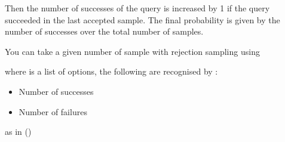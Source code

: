 \documentclass[letterpaper,10pt,english]{sphinxmanual}
\begin{document}
\sphinxAtStartPar
Then the number of successes of the query is increased by 1 if the query succeeded in the last accepted sample.
The final probability is given by the number of successes over the total number of samples.

\sphinxAtStartPar
You can take a given number of sample with rejection sampling using

\begin{sphinxVerbatim}[commandchars=\\\{\}]
  
\end{sphinxVerbatim}

\sphinxAtStartPar
where  is a list of options, the following are recognised by :
\begin{itemize}
\item {} 
\sphinxAtStartPar
{} Number of successes

\item {} 
\sphinxAtStartPar
{} Number of failures

\end{itemize}

\sphinxAtStartPar
as in ()

\begin{sphinxVerbatim}[commandchars=\\\{\}]
 \PYG{p}{[}\PYG{p}{]}
\end{sphinxVerbatim}
\end{document}
